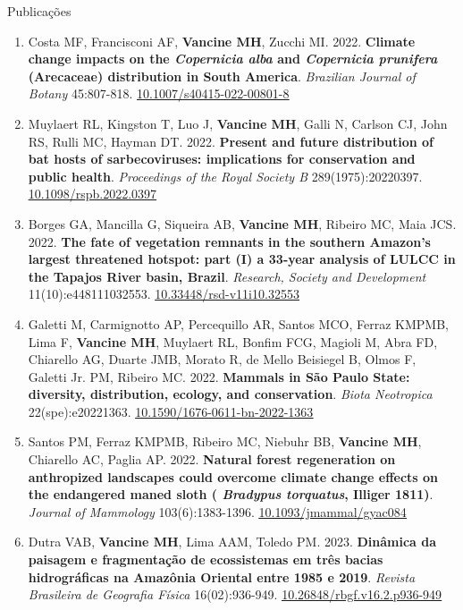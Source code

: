 \documentclass{resume}
\begin{document}
\begin{rSection}{Publicações}
\begin{enumerate}
\item Costa MF, Francisconi AF, {\bf Vancine MH}, Zucchi MI. 2022. {\bf Climate change impacts on the \textbf{\textit{ Copernicia alba}} and \textbf{\textit{Copernicia prunifera}} (Arecaceae) distribution in South America}. {\it Brazilian Journal of Botany} 45:807-818. \href{https://doi.org/10.1007/s40415-022-00801-8}{\underline{10.1007/s40415-022-00801-8}}

\item Muylaert RL, Kingston T, Luo J, {\bf Vancine MH}, Galli N, Carlson CJ, John RS, Rulli MC, Hayman DT. 2022. {\bf Present and future distribution of bat hosts of sarbecoviruses: implications for conservation and public health}. {\it Proceedings of the Royal Society B} 289(1975):20220397. \href{https://doi.org/10.1098/rspb.2022.0397}{\underline{10.1098/rspb.2022.0397}}

\item Borges GA, Mancilla G, Siqueira AB, {\bf Vancine MH}, Ribeiro MC, Maia JCS. 2022. {\bf The fate of vegetation remnants in the southern Amazon’s largest threatened hotspot: part (I) a 33-year analysis of LULCC in the Tapajos River basin, Brazil}. {\it Research, Society and Development} 11(10):e448111032553. \href{https://doi.org/10.33448/rsd-v11i10.32553}{\underline{10.33448/rsd-v11i10.32553}}

\item Galetti M, Carmignotto AP, Percequillo AR, Santos MCO, Ferraz KMPMB, Lima F, {\bf Vancine MH}, Muylaert RL, Bonfim FCG, Magioli M, Abra FD, Chiarello AG, Duarte JMB, Morato R, de Mello Beisiegel B, Olmos F, Galetti Jr. PM, Ribeiro MC. 2022. {\bf Mammals in São Paulo State: diversity, distribution, ecology, and conservation}. {\it Biota Neotropica} 22(spe):e20221363. \href{https://doi.org/10.1590/1676-0611-bn-2022-1363}{\underline{10.1590/1676-0611-bn-2022-1363}}

\item Santos PM, Ferraz KMPMB, Ribeiro MC, Niebuhr BB, {\bf Vancine MH}, Chiarello AC, Paglia AP. 2022. {\bf Natural forest regeneration on anthropized landscapes could overcome climate change effects on the endangered maned sloth (\textbf{\textit{ Bradypus torquatus}}, Illiger 1811)}. {\it Journal of Mammology} 103(6):1383-1396. \href{https://doi.org/10.1093/jmammal/gyac084}{\underline{10.1093/jmammal/gyac084}}

\item Dutra VAB, {\bf Vancine MH}, Lima AAM, Toledo PM. 2023. {\bf Dinâmica da paisagem e fragmentação de ecossistemas em três bacias hidrográficas na Amazônia Oriental entre 1985 e 2019}. {\it Revista Brasileira de Geografia Física} 16(02):936-949. \href{https://doi.org/10.26848/rbgf.v16.2.p936-949}{\underline{10.26848/rbgf.v16.2.p936-949}}


\end{enumerate}
\end{rSection}
\end{document}
